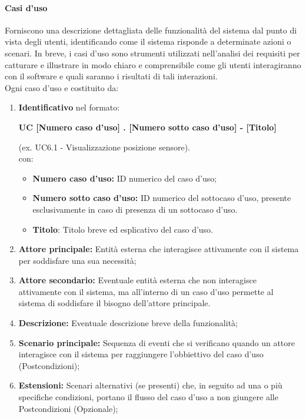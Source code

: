 \paragraph{Casi d'uso}
Forniscono una descrizione dettagliata delle funzionalità del sistema dal punto di vista degli utenti, identificando come il sistema risponde a determinate azioni o scenari. In breve, i casi d'uso sono strumenti utilizzati nell'analisi dei requisiti per catturare e illustrare in modo chiaro e comprensibile come gli utenti interagiranno con il software e quali saranno i risultati di tali interazioni. \\
Ogni caso d'uso e costituito da:
\begin{enumerate}
    \item \textbf{Identificativo} nel formato:\\
          \begin{center}
              \textbf{UC [Numero caso d'uso] . [Numero sotto caso d'uso] - [Titolo]}
          \end{center}
          (ex. UC6.1 - Visualizzazione posizione sensore).\\
          con:
          \begin{itemize}
              \item \textbf{Numero caso d'uso:} ID numerico del caso d'uso;
              \item \textbf{Numero sotto caso d'uso:} ID numerico del sottocaso d'uso, presente esclusivamente in caso di presenza di un sottocaso d'uso.
              \item \textbf{Titolo}: Titolo breve ed esplicativo del caso d'uso.
          \end{itemize}
    \item \textbf{Attore principale:} Entità esterna che interagisce attivamente con il sistema per soddisfare una sua necessità;
    \item \textbf{Attore secondario:} Eventuale entità esterna che non interagisce attivamente con il sistema, ma all'interno di un caso d'uso permette al sistema di soddisfare il bisogno dell'attore principale.
    \item \textbf{Descrizione:} Eventuale descrizione breve della funzionalità;
    \item \textbf{Scenario principale:} Sequenza di eventi che si verificano quando un attore interagisce con il sistema per raggiungere l'obbiettivo del caso d'uso (Postcondizioni);
    \item \textbf{Estensioni:} Scenari alternativi (se presenti) che, in seguito ad una o più specifiche condizioni, portano il flusso del caso d'uso a non giungere alle Postcondizioni (Opzionale);

\end{enumerate}
